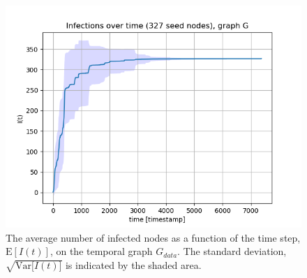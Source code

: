 \documentclass[letterpaper]{article}
\begin{document}
\begin{figure}[ht!]
  \centering
   \includegraphics[width=\textwidth]{img/infections_G_data.png}
   \caption{The average number of infected nodes as a function of the time step, $\mathrm{E}[I(t)]$, 
 on the temporal graph $G_{data}$. The standard deviation, $\sqrt{\mathrm{Var}{[I(t)}]}$ is indicated by the shaded area.}
   \label{fig:infections_G}
\end{figure}
\end{document}
